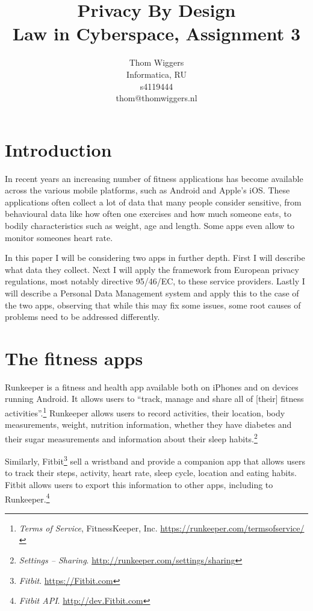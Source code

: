\documentclass{article}
\author{Thom Wiggers\\ \small Informatica, RU \\ \small s4119444 \\ \small thom@thomwiggers.nl }
\title{Privacy By Design\\ {\large Law in Cyberspace, Assignment 3}}
\begin{document}
\maketitle

\section{Introduction}

In recent years an increasing number of fitness applications has become available across the various mobile platforms, such as Android and Apple's iOS.
These applications often collect a lot of data that many people consider sensitive, from behavioural data like how often one exercises and how much someone eats, to bodily characteristics such as weight, age and length.
Some apps even allow to monitor someones heart rate.

In this paper I will be considering two apps in further depth. First I will describe what data they collect. Next I will apply the framework from European privacy regulations, most notably directive 95/46/EC, to these service providers. Lastly I will describe a Personal Data Management system and apply this to the case of the two apps, observing that while this may fix some issues, some root causes of problems need to be addressed differently.

\section{The fitness apps}

Runkeeper is a fitness and health app available both on iPhones and on devices running Android. It allows users to ``track, manage and share all of [their] fitness activities''.\footnote{\emph{Terms of Service}, FitnessKeeper, Inc. \url{https://runkeeper.com/termsofservice/}}
Runkeeper allows users to record activities, their location, body measurements, weight, nutrition information, whether they have diabetes and their sugar measurements and information about their sleep habits.\footnote{\emph{Settings -- Sharing}. \url{http://runkeeper.com/settings/sharing}}

Similarly, Fitbit\footnote{\emph{Fitbit}. \url{https://Fitbit.com}} sell a wristband and provide a companion app that allows users to track their steps, activity, heart rate, sleep cycle, location and eating habits.
Fitbit allows users to export this information to other apps, including to Runkeeper.\footnote{\emph{Fitbit API}. \url{http://dev.Fitbit.com}}
\end{document}
